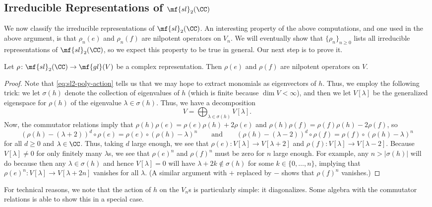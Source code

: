 \documentclass[../notes.tex]{subfiles}
\begin{document}
\subsection{Irreducible Representations of \texorpdfstring{$\mf{sl}_2(\CC)$}{sl2(C)}}
We now classify the irreducible representations of $\mf{sl}_2(\CC)$. An interesting property of the above computations, and one used in the above argument, is that $\rho_n(e)$ and $\rho_n(f)$ are nilpotent operators on $V_n$. We will eventually show that $\{\rho_n\}_{n\ge0}$ lists all irreducible representations of $\mf{sl}_2(\CC)$, so we expect this property to be true in general. Our next step is to prove it.
\begin{lemma} \label{lem:sl2-e-f-nilpotent}
	Let $\rho\colon\mf{sl}_2(\CC)\to\mf{gl}(V)$ be a complex representation. Then $\rho(e)$ and $\rho(f)$ are nilpotent operators on $V$.
\end{lemma}
\begin{proof}
	Note that \eqref{eq:sl2-poly-action} tells us that we may hope to extract monomials as eigenvectors of $h$. Thus, we employ the following trick: we let $\sigma(h)$ denote the collection of eigenvalues of $h$ (which is finite because $\dim V<\infty$), and then we let $V[\lambda]$ be the generalized eigenspace for $\rho(h)$ of the eigenvalue $\lambda\in\sigma(h)$. Thus, we have a decomposition
	\[V=\bigoplus_{\lambda\in\sigma(h)}V[\lambda].\]
	Now, the commutator relations imply that $\rho(h)\rho(e)=\rho(e)\rho(h)+2\rho(e)$ and $\rho(h)\rho(f)=\rho(f)\rho(h)-2\rho(f)$, so
	\[(\rho(h)-(\lambda+2))^d\circ\rho(e)=\rho(e)\circ(\rho(h)-\lambda)^n\qquad\text{and}\qquad(\rho(h)-(\lambda-2))^d\circ\rho(f)=\rho(f)\circ(\rho(h)-\lambda)^n\]
	for all $d\ge0$ and $\lambda\in\CC$. Thus, taking $d$ large enough, we see that $\rho(e)\colon V[\lambda]\to V[\lambda+2]$ and $\rho(f)\colon V[\lambda]\to V[\lambda-2]$. Because $V[\lambda]\ne0$ for only finitely many $\lambda$s, we see that $\rho(e)^n$ and $\rho(f)^n$ must be zero for $n$ large enough.  For example, any $n>\left|\sigma(h)\right|$ will do because then any $\lambda\in\sigma(h)$ and hence $V[\lambda]=0$ will have $\lambda+2k\notin\sigma(h)$ for some $k\in\{0,\ldots,n\}$, implying that $\rho(e)^n\colon V[\lambda]\to V[\lambda+2n]$ vanishes for all $\lambda$. (A similar argument with $+$ replaced by $-$ shows that $\rho(f)^n$ vanishes.)
\end{proof}
For technical reasons, we note that the action of $h$ on the $V_n$s is particularly simple: it diagonalizes. Some algebra with the commutator relations is able to show this in a special case.
\end{document}
